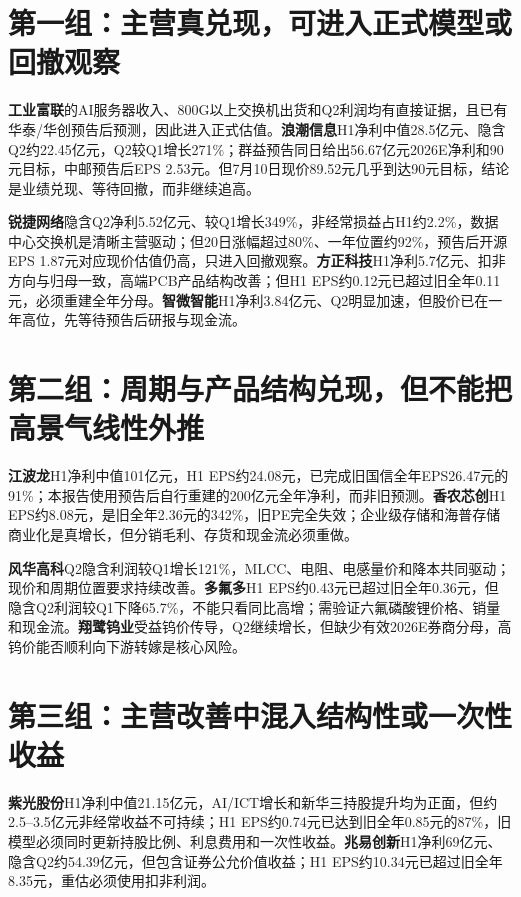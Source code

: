 \section{第一组：主营真兑现，可进入正式模型或回撤观察}

\textbf{工业富联}的AI服务器收入、800G以上交换机出货和Q2利润均有直接证据，且已有华泰/华创预告后预测，因此进入正式估值。\textbf{浪潮信息}H1净利中值28.5亿元、隐含Q2约22.45亿元，Q2较Q1增长271\%；群益预告同日给出56.67亿元2026E净利和90元目标，中邮预告后EPS 2.53元。但7月10日现价89.52元几乎到达90元目标，结论是业绩兑现、等待回撤，而非继续追高。

\textbf{锐捷网络}隐含Q2净利5.52亿元、较Q1增长349\%，非经常损益占H1约2.2\%，数据中心交换机是清晰主营驱动；但20日涨幅超过80\%、一年位置约92\%，预告后开源EPS 1.87元对应现价估值仍高，只进入回撤观察。\textbf{方正科技}H1净利5.7亿元、扣非方向与归母一致，高端PCB产品结构改善；但H1 EPS约0.12元已超过旧全年0.11元，必须重建全年分母。\textbf{智微智能}H1净利3.84亿元、Q2明显加速，但股价已在一年高位，先等待预告后研报与现金流。

\section{第二组：周期与产品结构兑现，但不能把高景气线性外推}

\textbf{江波龙}H1净利中值101亿元，H1 EPS约24.08元，已完成旧国信全年EPS26.47元的91\%；本报告使用预告后自行重建的200亿元全年净利，而非旧预测。\textbf{香农芯创}H1 EPS约8.08元，是旧全年2.36元的342\%，旧PE完全失效；企业级存储和海普存储商业化是真增长，但分销毛利、存货和现金流必须重做。

\textbf{风华高科}Q2隐含利润较Q1增长121\%，MLCC、电阻、电感量价和降本共同驱动；现价和周期位置要求持续改善。\textbf{多氟多}H1 EPS约0.43元已超过旧全年0.36元，但隐含Q2利润较Q1下降65.7\%，不能只看同比高增；需验证六氟磷酸锂价格、销量和现金流。\textbf{翔鹭钨业}受益钨价传导，Q2继续增长，但缺少有效2026E券商分母，高钨价能否顺利向下游转嫁是核心风险。

\section{第三组：主营改善中混入结构性或一次性收益}

\textbf{紫光股份}H1净利中值21.15亿元，AI/ICT增长和新华三持股提升均为正面，但约2.5--3.5亿元非经常收益不可持续；H1 EPS约0.74元已达到旧全年0.85元的87\%，旧模型必须同时更新持股比例、利息费用和一次性收益。\textbf{兆易创新}H1净利69亿元、隐含Q2约54.39亿元，但包含证券公允价值收益；H1 EPS约10.34元已超过旧全年8.35元，重估必须使用扣非利润。

